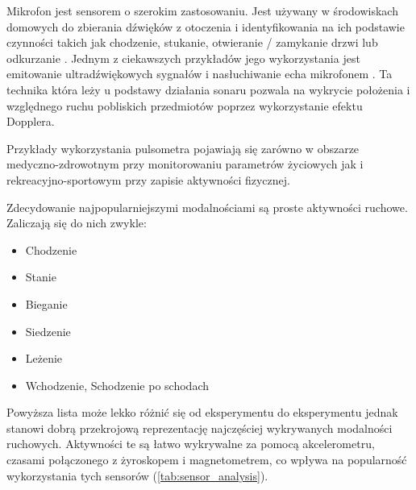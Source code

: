 Mikrofon jest sensorem o szerokim zastosowaniu. Jest używany w środowiskach domowych do zbierania dźwięków z otoczenia i identyfikowania na ich podstawie czynności takich jak chodzenie, stukanie, otwieranie / zamykanie drzwi lub odkurzanie \cite{46_Indor_Audio_Rec}. Jednym z ciekawszych przykładów jego wykorzystania jest emitowanie ultradźwiękowych sygnałów i nasłuchiwanie echa mikrofonem \cite{22_HAR_Survey_Ultrasonic}. Ta technika która leży u podstawy działania sonaru pozwala na wykrycie położenia i względnego ruchu pobliskich przedmiotów poprzez wykorzystanie efektu Dopplera.

Przykłady wykorzystania pulsometra pojawiają się zarówno w obszarze medyczno-zdrowotnym \cite{62_The_Long_Review} przy monitorowaniu parametrów życiowych jak i rekreacyjno-sportowym \cite{51_Fixbit_tracker} przy zapisie aktywności fizycznej.

Zdecydowanie najpopularniejszymi modalnościami są proste aktywności ruchowe. Zaliczają się do nich zwykle:
\begin{itemize}
    \item Chodzenie
    \item Stanie
    \item Bieganie
    \item Siedzenie
    \item Leżenie
    \item Wchodzenie, Schodzenie po schodach
    \label{base_modalities}
\end{itemize}

Powyższa lista może lekko różnić się od eksperymentu do eksperymentu jednak stanowi dobrą przekrojową reprezentację najczęściej wykrywanych modalności ruchowych. Aktywności te są łatwo wykrywalne za pomocą akcelerometru, czasami połączonego z żyroskopem i magnetometrem, co wpływa na popularność wykorzystania tych sensorów (\ref{tab:sensor_analysis}).
